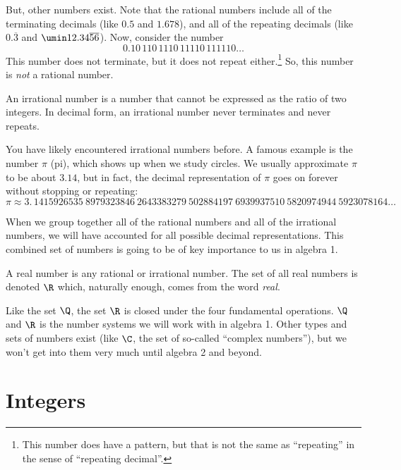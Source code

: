 But, other numbers exist. Note that the rational numbers include all of the terminating decimals (like $0.5$ and $1.678$), and all of the repeating decimals (like $0.\overline{3}$ and $\umin12.34\overline{56}$). Now, consider the number \[0.10\,110\,1110\,11110\,111110\ldots\] This number does not terminate, but it does not repeat either.\footnote{This number does have a pattern, but that is not the same as ``repeating'' in the sense of ``repeating decimal''.} So, this number is \textit{not} a rational number.

\begin{boxeddef}
An \gls{irrational number} is a number that cannot be expressed as the ratio of two integers. In decimal form, an irrational number never terminates and never repeats.
\end{boxeddef}

You have likely encountered irrational numbers before. A famous example is the number $\pi$ (pi), which shows up when we study circles. We usually approximate $\pi$ to be about $3.14$, but in fact, the decimal representation of $\pi$ goes on forever without stopping or repeating: \[\pi \approx 3. \, 1415926535 ~ 8979323846 ~ 2643383279 ~ 502884197 ~ 6939937510 ~ 5820974944 ~ 5923078164\ldots\]

When we group together all of the rational numbers and all of the irrational numbers, we will have accounted for all possible decimal representations. This combined set of numbers is going to be of key importance to us in algebra 1.

\begin{boxeddef}
A \gls{real number} is any rational or irrational number. The set of all real numbers is denoted $\R$ which, naturally enough, comes from the word \textit{real}.
\end{boxeddef}

Like the set $\Q$, the set $\R$ is closed under the four fundamental operations. $\Q$ and $\R$ is the number systems we will work with in algebra 1. Other types and sets of numbers exist (like $\C$, the set of so-called ``complex numbers''), but we won't get into them very much until algebra 2 and beyond.


\section{Integers}
\label{sec:integers}

